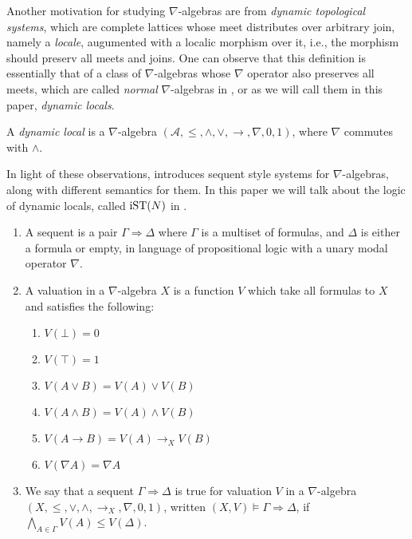 \documentclass[a4paper, 12pt]{amsart}
\begin{document}
Another motivation for studying $\nabla$-algebras are from \emph{dynamic topological systems}, which are complete lattices whose meet distributes over arbitrary join, namely a \emph{locale}, augumented with a localic morphism over it, i.e., the morphism should preserv all meets and joins. One can observe that this definition is essentially that of a class of $\nabla$-algebras whose $\nabla$ operator also preserves all meets, which are called \emph{normal} $\nabla$-algebras in \cite{amir}, or as we will call them in this paper, \emph{dynamic locals}.

\begin{dfn}
  A \emph{dynamic local} is a $\nabla$-algebra $(\mathcal{A}, \le, \wedge, \vee, \rightarrow, \nabla, 0, 1)$, where $\nabla$ commutes with $\wedge$.
\end{dfn}

In light of these observations, \cite{amir} introduces sequent style systems for $\nabla$-algebras, along with different semantics for them. In this paper we will talk about the logic of dynamic locals, called $\text{iST}(N)$ in \cite{amir}.
\begin{dfn}\quad
  \begin{enumerate}
    \item A sequent is a pair $\Gamma \Rightarrow \Delta$ where $\Gamma$ is a multiset of formulas, and $\Delta$ is either a formula or empty, in language of propositional logic with a unary modal operator $\nabla$.
    \item A valuation in a $\nabla$-algebra $X$ is a function $V$ which take all formulas to $X$ and satisfies the following:
    \begin{enumerate}
      \item $V(\bot) = 0$
      \item $V(\top) = 1$
      \item $V(A \vee B) = V(A) \vee V(B)$
      \item $V(A \wedge B) = V(A) \wedge V(B)$
      \item $V(A \rightarrow B) = V(A) \rightarrow_X V(B)$
      \item $V(\nabla A) = \nabla A$
    \end{enumerate}
    \item We say that a sequent $\Gamma \Rightarrow \Delta$ is true for valuation $V$ in a $\nabla$-algebra $(X, \le, \vee, \wedge, \rightarrow_X, \nabla, 0, 1)$, written $(X, V) \vDash \Gamma \Rightarrow \Delta$, if $\bigwedge_{A \in \Gamma} V(A) \le V(\Delta)$.
  \end{enumerate}
\end{dfn}
\end{document}
